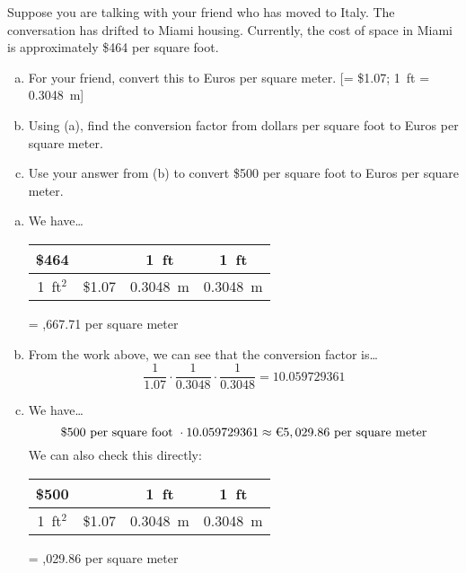 \documentclass[11pt,letterpaper]{article}
\begin{document}
\newpage



 Suppose you are talking with your friend who has moved to Italy. The conversation has drifted to Miami housing. Currently, the cost of space in Miami is approximately \$464 per square foot. 
	\begin{enumerate}[(a)]
	\item For your friend, convert this to Euros per square meter. [= \$1.07; 1~ft = 0.3048~m]
	\item Using (a), find the conversion factor from dollars per square foot to Euros per square meter. 
	\item Use your answer from (b) to convert \$500 per square foot to Euros per square meter. 
	\end{enumerate} \pspace

\sol 
\begin{enumerate}[(a)]
\item We have\dots \par
	\begin{table}[H]
	\centering
	\begin{tabular}{c||c|c|c}
	\$464	& \texteuro 1	& 1~ft		& 1~ft \\ \hline
	1~ft$^2$   & \$1.07 		& 0.3048~m     & 0.3048~m
	\end{tabular}\;= ,667.71 per square meter
	\end{table} \pspace

\item From the work above, we can see that the conversion factor is\dots
	\[
	\dfrac{1}{1.07} \cdot \dfrac{1}{0.3048} \cdot \dfrac{1}{0.3048}= 10.059729361
	\] \pspace

\item We have\dots 
	\[
	\$500 \text{ per square foot } \cdot 10.059729361 \approx \text{\texteuro } 5,029.86 \text{ per square meter}
	\] \pspace
We can also check this directly: \par \pspace
	\begin{table}[H]
	\centering
	\begin{tabular}{c||c|c|c}
	\$500	& \texteuro 1	& 1~ft		& 1~ft \\ \hline
	1~ft$^2$   & \$1.07 		& 0.3048~m     & 0.3048~m
	\end{tabular}\;= ,029.86 per square meter
	\end{table} \pspace
\end{enumerate}
\end{document}
